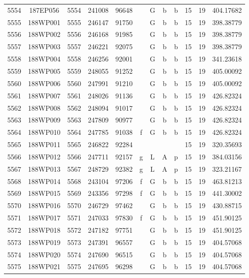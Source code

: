 \begin{tabular}{|*{12}{c|}}
5554 & 187EP056 & 5554 & 241008 & 96648 &  & G & b & b & 15 & 19 & 404.17682 \\ 
5555 & 188WP001 & 5555 & 246147 & 91750 &  & G & b & b & 15 & 19 & 398.38779 \\ 
5556 & 188WP002 & 5556 & 246168 & 91985 &  & G & b & b & 15 & 19 & 398.38779 \\ 
5557 & 188WP003 & 5557 & 246221 & 92075 &  & G & b & b & 15 & 19 & 398.38779 \\ 
5558 & 188WP004 & 5558 & 246256 & 92001 &  & G & b & b & 15 & 19 & 341.23618 \\ 
5559 & 188WP005 & 5559 & 248055 & 91252 &  & G & b & b & 15 & 19 & 405.00092 \\ 
5560 & 188WP006 & 5560 & 247991 & 91210 &  & G & b & b & 15 & 19 & 405.00092 \\ 
5561 & 188WP007 & 5561 & 248026 & 91136 &  & G & b & b & 15 & 19 & 426.82324 \\ 
5562 & 188WP008 & 5562 & 248094 & 91017 &  & G & b & b & 15 & 19 & 426.82324 \\ 
5563 & 188WP009 & 5563 & 247809 & 90977 &  & G & b & b & 15 & 19 & 426.82324 \\ 
5564 & 188WP010 & 5564 & 247785 & 91038 & f & G & b & b & 15 & 19 & 426.82324 \\ 
5565 & 188WP011 & 5565 & 246822 & 92284 &  &  &  &  & 15 & 19 & 320.35693 \\ 
5566 & 188WP012 & 5566 & 247711 & 92157 & g & L & A & p & 15 & 19 & 384.03156 \\ 
5567 & 188WP013 & 5567 & 248729 & 92382 & g & L & A & p & 15 & 19 & 323.21167 \\ 
5568 & 188WP014 & 5568 & 243104 & 97206 & f & G & b & b & 15 & 19 & 463.81213 \\ 
5569 & 188WP015 & 5569 & 243356 & 97298 & f & G & b & b & 15 & 19 & 441.30002 \\ 
5570 & 188WP016 & 5570 & 246729 & 97462 &  & G & b & b & 15 & 19 & 430.88715 \\ 
5571 & 188WP017 & 5571 & 247033 & 97830 & f & G & b & b & 15 & 19 & 451.90125 \\ 
5572 & 188WP018 & 5572 & 247182 & 97751 &  & G & b & b & 15 & 19 & 451.90125 \\ 
5573 & 188WP019 & 5573 & 247391 & 96557 &  & G & b & b & 15 & 19 & 404.57068 \\ 
5574 & 188WP020 & 5574 & 247690 & 96515 &  & G & b & b & 15 & 19 & 404.57068 \\ 
5575 & 188WP021 & 5575 & 247695 & 96298 &  & G & b & b & 15 & 19 & 404.57068 \\ 

\end{tabular}
